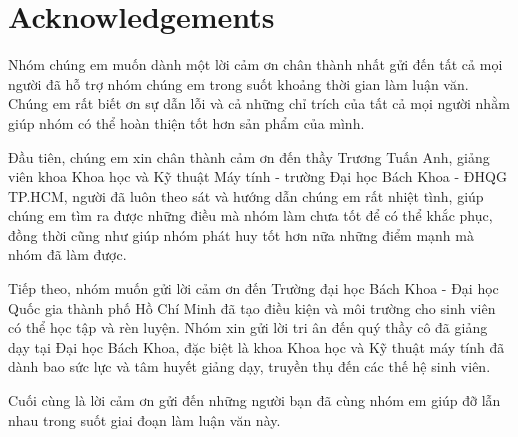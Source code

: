 \chapter{Acknowledgements}

Nhóm chúng em muốn dành một lời cảm ơn chân thành nhất gửi đến tất cả mọi người đã hỗ trợ nhóm chúng em trong suốt khoảng thời gian làm luận văn. Chúng em rất biết ơn sự dẫn lỗi và cả những chỉ trích của tất cả mọi người nhằm giúp nhóm có thể hoàn thiện tốt hơn sản phẩm của mình. \par

Đầu tiên, chúng em xin chân thành cảm ơn đến thầy Trương Tuấn Anh, giảng viên khoa Khoa học và Kỹ thuật Máy tính - trường Đại học Bách Khoa - ĐHQG TP.HCM, người đã luôn theo sát và hướng dẫn chúng em rất nhiệt tình, giúp chúng em tìm ra được những điều mà nhóm làm chưa tốt để có thể khắc phục, đồng thời cũng như giúp nhóm phát huy tốt hơn nữa những điểm mạnh mà nhóm đã làm được. \par

Tiếp theo, nhóm muốn gửi lời cảm ơn đến Trường đại học Bách Khoa - Đại học Quốc gia thành phố Hồ
Chí Minh đã tạo điều kiện và môi trường cho sinh viên có thể học tập và rèn luyện. Nhóm xin gửi lời tri ân
đến quý thầy cô đã giảng dạy tại Đại học Bách Khoa, đặc biệt là khoa Khoa học và Kỹ thuật máy tính đã
dành bao sức lực và tâm huyết giảng dạy, truyền thụ đến các thế hệ sinh viên. \par

Cuối cùng là lời cảm ơn gửi đến những người bạn đã cùng nhóm em giúp đỡ lẫn nhau trong suốt giai đoạn làm luận văn này.